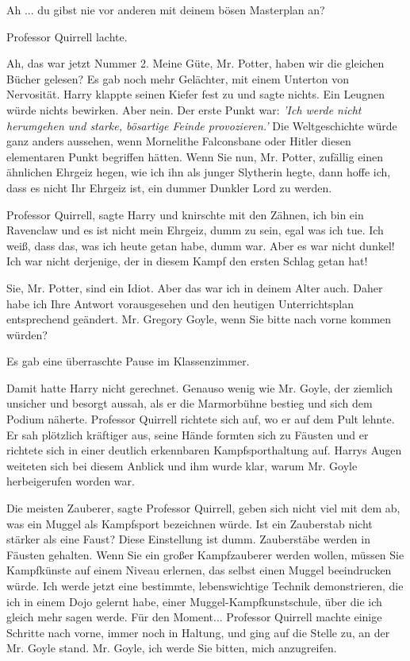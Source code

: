 \glqq{}Ah ... du gibst nie vor anderen mit deinem bösen Masterplan an?\grqq{}

Professor Quirrell lachte.

\glqq{}Ah, das war jetzt Nummer 2. Meine Güte, Mr. Potter, haben wir die gleichen
Bücher gelesen?\grqq{} Es gab noch mehr Gelächter, mit einem Unterton von
Nervosität. Harry klappte seinen Kiefer fest zu und sagte nichts. Ein Leugnen
würde nichts bewirken. \glqq{}Aber nein. Der erste Punkt war: \emph{'Ich werde
nicht herumgehen und starke, bösartige Feinde provozieren.'} Die Weltgeschichte
würde ganz anders aussehen, wenn Mornelithe Falconsbane oder Hitler diesen
elementaren Punkt begriffen hätten. Wenn Sie nun, Mr. Potter, zufällig einen
ähnlichen Ehrgeiz hegen, wie ich ihn als junger Slytherin hegte, dann hoffe ich,
dass es nicht Ihr Ehrgeiz ist, ein dummer Dunkler Lord zu werden.\grqq{}

\glqq{}Professor Quirrell\grqq{}, sagte Harry und knirschte mit den Zähnen, \glqq
ich bin ein Ravenclaw und es ist nicht mein Ehrgeiz, dumm zu sein, egal was ich
tue. Ich weiß, dass das, was ich heute getan habe, dumm war. Aber es war nicht
dunkel! Ich war nicht derjenige, der in diesem Kampf den ersten Schlag getan
hat!\grqq{}

\glqq{}Sie, Mr. Potter, sind ein Idiot. Aber das war ich in deinem Alter auch.
Daher habe ich Ihre Antwort vorausgesehen und den heutigen Unterrichtsplan
entsprechend geändert. Mr. Gregory Goyle, wenn Sie bitte nach vorne kommen
würden?\grqq{}

Es gab eine überraschte Pause im Klassenzimmer.

Damit hatte Harry nicht gerechnet. Genauso wenig wie Mr. Goyle, der ziemlich
unsicher und besorgt aussah, als er die Marmorbühne bestieg und sich dem Podium
näherte. Professor Quirrell richtete sich auf, wo er auf dem Pult lehnte. Er sah
plötzlich kräftiger aus, seine Hände formten sich zu Fäusten und er richtete
sich in einer deutlich erkennbaren Kampfsporthaltung auf. Harrys Augen weiteten
sich bei diesem Anblick und ihm wurde klar, warum Mr. Goyle herbeigerufen worden
war.

\glqq{}Die meisten Zauberer\grqq{}, sagte Professor Quirrell, \glqq{}geben sich
nicht viel mit dem ab, was ein Muggel als Kampfsport bezeichnen würde. Ist ein
Zauberstab nicht stärker als eine Faust? Diese Einstellung ist dumm. Zauberstäbe
werden in Fäusten gehalten. Wenn Sie ein großer Kampfzauberer werden wollen,
müssen Sie Kampfkünste auf einem Niveau erlernen, das selbst einen Muggel
beeindrucken würde. Ich werde jetzt eine bestimmte, lebenswichtige Technik
demonstrieren, die ich in einem Dojo gelernt habe, einer
Muggel-Kampfkunstschule, über die ich gleich mehr sagen werde. Für den
Moment...\grqq{} Professor Quirrell machte einige Schritte nach vorne, immer
noch in Haltung, und ging auf die Stelle zu, an der Mr. Goyle stand. \glqq{}Mr.
Goyle, ich werde Sie bitten, mich anzugreifen.\grqq{}

